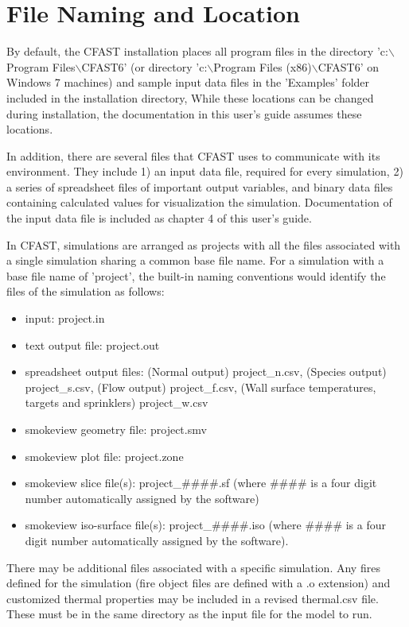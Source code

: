 \section{File Naming and Location}

By default, the CFAST installation places all program files in the directory 'c:$\backslash$Program Files$\backslash$CFAST6' (or directory 'c:$\backslash$Program Files (x86)$\backslash$CFAST6'  on Windows 7 machines) and sample input data files in the 'Examples' folder included in the installation directory, While these locations can be changed during installation, the documentation in this user's guide assumes these locations.

In addition, there are several files that CFAST uses to communicate with its environment.  They include 1) an input data file, required for every simulation, 2) a series of spreadsheet files of important output variables, and binary data files containing calculated values for visualization the simulation.  Documentation of the input data file is included as chapter 4 of this user's guide.

In CFAST, simulations are arranged as projects with all the files associated with a single simulation sharing a common base file name.  For a simulation with a base file name of 'project', the built-in naming conventions would identify the files of the simulation as follows:

\begin{itemize}
\item input: project.in
\item text output file: project.out
\item spreadsheet output files: (Normal output) project\_n.csv, (Species output) project\_s.csv, (Flow output) project\_f.csv, (Wall surface temperatures, targets and sprinklers) project\_w.csv
\item smokeview geometry file: project.smv
\item smokeview plot file: project.zone
\item smokeview slice file(s): project\_\#\#\#\#.sf (where \#\#\#\# is a four digit number automatically assigned by the software)
\item smokeview iso-surface file(s): project\_\#\#\#\#.iso (where \#\#\#\# is a four digit number automatically assigned by the software).
\end{itemize}

There may be additional files associated with a specific simulation.  Any fires defined for the simulation (fire object files are defined with a .o extension) and customized thermal properties may be included in a revised thermal.csv file.  These must be in the same directory as the input file for the model to run.

